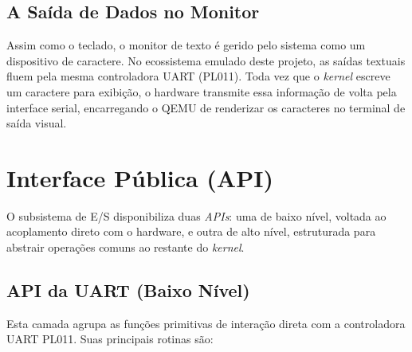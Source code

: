 \subsection{A Saída de Dados no Monitor}

Assim como o teclado, o monitor de texto é gerido pelo sistema como um dispositivo de caractere. No ecossistema emulado deste projeto, as saídas textuais fluem pela mesma controladora UART (PL011). Toda vez que o \textit{kernel} escreve um caractere para exibição, o hardware transmite essa informação de volta pela interface serial, encarregando o QEMU de renderizar os caracteres no terminal de saída visual.

\section{Interface Pública (API)}

O subsistema de E/S disponibiliza duas \textit{APIs}: uma de baixo nível, voltada ao acoplamento direto com o hardware, e outra de alto nível, estruturada para abstrair operações comuns ao restante do \textit{kernel}.

\subsection{API da UART (Baixo Nível)}

Esta camada agrupa as funções primitivas de interação direta com a controladora UART PL011. Suas principais rotinas são:

